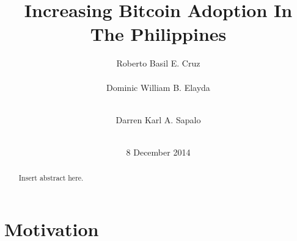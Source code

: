 \documentclass{acm_proc_article-sp}
\begin{document}
\title{Increasing Bitcoin Adoption In The Philippines}

\author{
\alignauthor
Roberto Basil E. Cruz\\
       \\
\alignauthor
\alignauthor Dominic William B. Elayda\\
       \\
\and
\alignauthor
Darren Karl A. Sapalo\\
       \\
}
\date{8 December 2014}

\maketitle
\begin{abstract}

Insert abstract here.

\end{abstract}



\section{Motivation}
\end{document}
